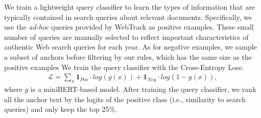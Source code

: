 We train a lightweight query classifier to learn the types of information that are typically contained in search queries about relevant documents.
Specifically, we use the \textit{ad-hoc} queries provided by WebTrack \cite{WebTrack} as positive examples. These small number of queries are manually selected to reflect important characteristics of authentic Web search queries for each year.
As for negative examples, we sample a subset of anchors before filtering by our rules, which has the same size as the positive examples
We train the query classifier with the Cross-Entropy Loss:
\begin{align}
    \mathcal{L} = \sum_x \mathbf{1}_{Pos} \cdot log(g(x)) + \mathbf{1}_{Neg} \cdot log(1-g(x)),
\end{align}
where $g$ is a miniBERT-based \cite{minibert} model. After training the query classifier, we rank all the anchor text by the logits of the positive class (i.e., similarity to search queries) and only keep the top 25\%.





\begin{table}[t]
\centering

\caption{The statistics of ClueWeb22 anchor training data.}
\label{tab:data_stat}
\end{table}



